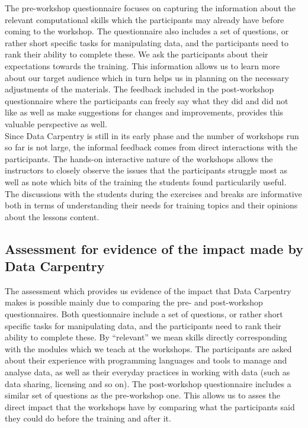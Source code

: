 \documentclass[15]{idcc}
\begin{document}
\begin{itemize}
The pre-workshop questionnaire focuses on capturing the information about the relevant computational skills which the participants may already
have before coming to the workshop. The questionnaire also includes
a set of questions, or rather short specific tasks for manipulating data, and the participants need to rank their ability to complete these.
We ask the participants about their expectations towards the training. This information allows us to learn more about our target audience which
in turn helps us in planning on the necessary adjustments of the materials. The feedback included in the post-workshop questionnaire
where the participants can freely say what they did and did not like as well as  make suggestions for changes and improvements, provides this
valuable perspective as well. \\

Since Data Carpentry is still in its early phase and the number of workshops run so far is not large, the informal feedback comes from direct interactions with the participants.
The hands-on interactive nature of the workshops allows the instructors to closely observe the issues that the participants struggle most as well as note which bits of the training the students
found particularily useful. The discussions with the students during the exercises and breaks are informative both in terms of understanding
their needs for training topics and their opinions about the lessons content.



\subsection{Assessment for evidence of the impact made by Data Carpentry}

The assessment which provides us evidence of the impact that Data Carpentry makes is possible mainly due to comparing the pre- and post-workshop questionnaires.
 Both questionnaire include a set of questions, or rather short specific tasks for manipulating data, and the participants need to rank their ability to complete these.
By ``relevant'' we mean skills directly corresponding with the modules which we teach at the workshops. The
participants are asked about their experience with programming languages and tools to manage and analyse data, as well as their everyday practices
in working with data (such as data sharing, licensing and so on). The post-workshop questionnaire includes a similar set of questions as the
pre-workshop one. This allows us to asses the direct impact that the workshops
have by comparing what the participants said they could do before the training and after it.


\end{itemize}
\end{document}
